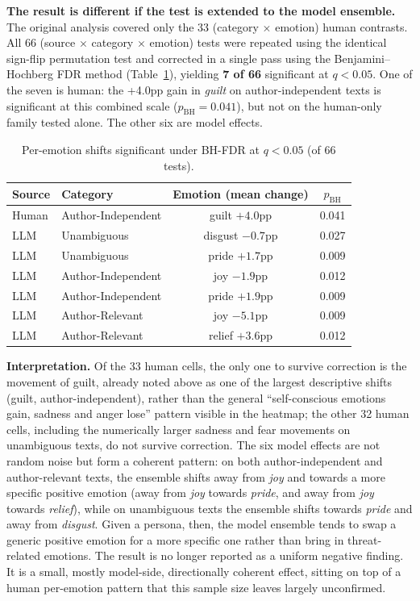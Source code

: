 \textbf{The result is different if the test is extended to the model ensemble.} The original analysis covered
only the 33 (category $\times$ emotion) human contrasts. All 66
(source $\times$ category $\times$ emotion) tests were repeated using the identical sign-flip
permutation test and corrected in a single pass using the Benjamini--Hochberg FDR method
(Table~\ref{tab:emotionsig}), yielding \textbf{7 of 66} significant at $q<0.05$. One of the
seven is human: the +4.0pp gain in \emph{guilt} on author-independent texts is significant at this
combined scale ($p_{\text{BH}} = 0.041$), but not on the human-only family tested alone. The other
six are model effects.

\begin{table}[h]
\centering
\footnotesize
\caption{Per-emotion shifts significant under BH-FDR at $q<0.05$ (of 66 tests).}
\label{tab:emotionsig}
\begin{tabular}{llcc}
\hline
\textbf{Source} & \textbf{Category} & \textbf{Emotion (mean change)} & $p_{\text{BH}}$ \\
\hline
Human & Author-Independent & guilt $+4.0$pp & 0.041 \\
LLM   & Unambiguous         & disgust $-0.7$pp & 0.027 \\
LLM   & Unambiguous         & pride $+1.7$pp & 0.009 \\
LLM   & Author-Independent  & joy $-1.9$pp & 0.012 \\
LLM   & Author-Independent  & pride $+1.9$pp & 0.009 \\
LLM   & Author-Relevant     & joy $-5.1$pp & 0.009 \\
LLM   & Author-Relevant     & relief $+3.6$pp & 0.012 \\
\hline
\end{tabular}
\end{table}

\noindent
\textbf{Interpretation.} Of the 33 human cells, the only one to survive correction is the
movement of guilt, already noted above as one of the largest descriptive
shifts (guilt, author-independent), rather than the general ``self-conscious emotions gain,
sadness and anger lose'' pattern visible in the heatmap; the other 32 human cells, including the
numerically larger sadness and fear movements on unambiguous texts, do not survive correction. The
six model effects are not random noise but form a coherent pattern: on both author-independent
and author-relevant texts, the ensemble shifts away from \emph{joy} and towards a more specific
positive emotion (away from \emph{joy} towards \emph{pride}, and away from \emph{joy} towards
\emph{relief}), while on unambiguous texts the ensemble shifts towards \emph{pride} and away from
\emph{disgust}. Given a persona, then, the model ensemble tends to swap a generic positive
emotion for a more specific one rather than bring in threat-related emotions. The result is no
longer reported as a uniform negative finding. It is a small, mostly model-side, directionally
coherent effect, sitting on top of a human per-emotion pattern that this sample size leaves
largely unconfirmed.

